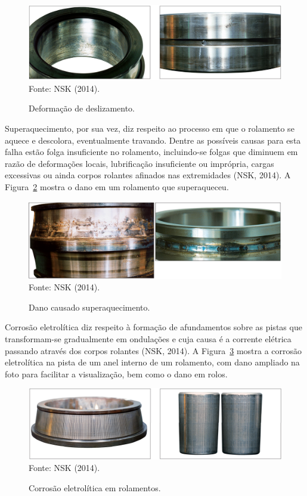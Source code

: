 \documentclass[
	12pt,				
	oneside,			
	a4paper,			
	english,			
	brazil,			
	]{abntex2ppgsi}
\begin{document}
\begin{figure}[H]
\centering
\caption {Deformação de deslizamento.}
\includegraphics[width=\textwidth,height=\textheight,keepaspectratio]{deslizamento_nsk} \\
Fonte: NSK (2014).
\label{deslizamento_nsk}
\end{figure}

Superaquecimento, por sua vez, diz respeito ao processo em que o rolamento se aquece e descolora, eventualmente travando. Dentre as possíveis causas para esta falha estão folga insuficiente no rolamento, incluindo-se folgas que diminuem em razão de deformações locais, lubrificação insuficiente ou imprópria, cargas excessivas ou ainda corpos rolantes afinados nas extremidades (NSK, 2014). A Figura~\ref{superaquecimento_nsk} mostra o dano em um rolamento que superaqueceu.

\begin{figure}[H]
\centering
\caption {Dano causado superaquecimento.}
\includegraphics[width=\textwidth,height=\textheight,keepaspectratio]{superaquecimento_nsk} \\
Fonte: NSK (2014).
\label{superaquecimento_nsk}
\end{figure}

Corrosão eletrolítica diz respeito à formação de afundamentos sobre as pistas que transformam-se gradualmente em ondulações e cuja causa é a corrente elétrica passando através dos corpos rolantes (NSK, 2014). A Figura~\ref{corrosao_eletrolitica_nsk} mostra a corrosão eletrolítica na pista de um anel interno de um rolamento, com dano ampliado na foto para facilitar a visualização, bem como o dano em rolos. 

\begin{figure}[H]
\centering
\caption {Corrosão eletrolítica em rolamentos.}
\includegraphics[width=\textwidth,height=\textheight,keepaspectratio]{corrosao_eletrolitica_nsk} \\
Fonte: NSK (2014).
\label{corrosao_eletrolitica_nsk}
\end{figure}
\end{document}
